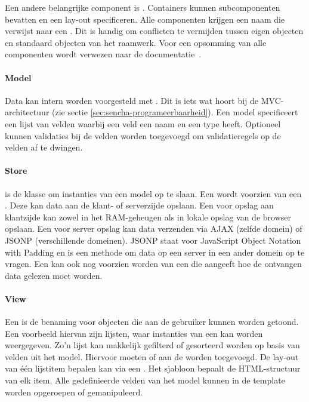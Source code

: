 Een andere belangrijke component is .  
Containers kunnen subcomponenten bevatten en een lay-out specificeren.  
Alle componenten krijgen een naam die verwijst naar een .  
Dit is handig om conflicten te vermijden tussen eigen objecten en standaard objecten van het raamwerk.  
Voor een opsomming van alle componenten wordt verwezen naar de documentatie~\cite{Inc.2013a}.

\paragraph{Model}
Data kan intern worden voorgesteld met .  
Dit is iets wat hoort bij de MVC-architectuur (zie sectie \ref{sec:sencha-programeerbaarheid}).  
Een model specificeert een lijst van velden waarbij een veld een naam en een type heeft.  
Optioneel kunnen validaties bij de velden worden toegevoegd om validatieregels op de velden af te dwingen.  

\paragraph{Store}
 is de klasse om instanties van een model op te slaan.  
Een  wordt voorzien van een .  
Deze kan data aan de klant- of serverzijde opslaan.  
Een  voor opslag aan klantzijde kan zowel in het RAM-geheugen als in lokale opslag van de browser opslaan.  
Een  voor server opslag kan data verzenden via AJAX (zelfde domein) of JSONP (verschillende domeinen).  
JSONP staat voor JavaScript Object Notation with Padding en is een methode om data op een server in een ander domein op te vragen.
Een  kan ook nog voorzien worden van een  die aangeeft hoe de ontvangen data gelezen moet worden.

\paragraph{View}
Een  is de benaming voor objecten die aan de gebruiker kunnen worden getoond.  
Een voorbeeld hiervan zijn lijsten,  waar instanties van een  kan worden weergegeven.  
Zo'n lijst kan makkelijk gefilterd of gesorteerd worden op basis van velden uit het model.
Hiervoor moeten  of  aan de  worden toegevoegd. 
De lay-out van één lijstitem bepalen kan via een .  
Het sjabloon bepaalt de HTML-structuur van elk item.  
Alle gedefinieerde velden van het model kunnen in de template worden opgeroepen of gemanipuleerd.

